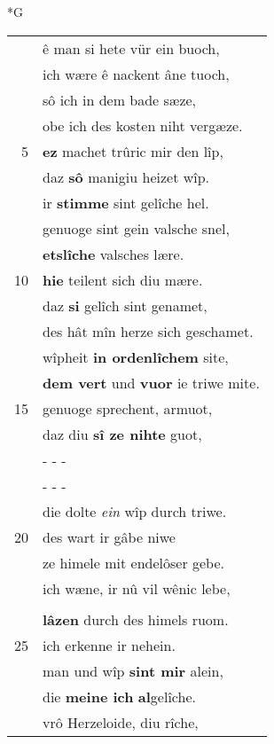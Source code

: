 \documentclass[8pt,a4paper,notitlepage]{article}
\begin{document}
\newpage
\begin{table}[ht]
\begin{minipage}[t]{0.5\linewidth}
\small
\begin{center}*G
\end{center}
\begin{tabular}{rl}
 & ê man si hete vür ein buoch,\\ 
 & ich wære ê nackent âne tuoch,\\ 
 & sô ich in dem bade sæze,\\ 
 & obe ich des kosten niht vergæze.\\ 
5 & \textbf{ez} machet trûric mir den lîp,\\ 
 & daz \textbf{sô} manigiu heizet wîp.\\ 
 & ir \textbf{stimme} sint gelîche hel.\\ 
 & genuoge sint gein valsche snel,\\ 
 & \textbf{etslîche} valsches lære.\\ 
10 & \textbf{hie} teilent sich diu mære.\\ 
 & daz \textbf{si} gelîch sint genamet,\\ 
 & des hât mîn herze sich geschamet.\\ 
 & wîpheit \textbf{in ordenlîchem} site,\\ 
 & \textbf{dem vert} und \textbf{vuor} ie triwe mite.\\ 
15 & genuoge sprechent, armuot,\\ 
 & daz diu \textbf{sî ze nihte} guot,\\ 
 & \multicolumn{1}{l}{ - - - }\\ 
 & \multicolumn{1}{l}{ - - - }\\ 
 & die dolte \textit{ein} wîp durch triwe.\\ 
20 & des wart ir gâbe niwe\\ 
 & ze himele mit endelôser gebe.\\ 
 & ich wæne, ir nû vil wênic lebe,\\ 
 & \textbf{\begin{large}D\end{large}ie junc} der erde rîchtuom\\ 
 & \textbf{lâzen} durch des himels ruom.\\ 
25 & ich erkenne ir nehein.\\ 
 & man und wîp \textbf{sint mir} alein,\\ 
 & die \textbf{meine ich} \textbf{al}gelîche.\\ 
 & vrô Herzeloide, diu rîche,\\ 

\end{tabular}
\end{minipage}
\end{table}
\end{document}
